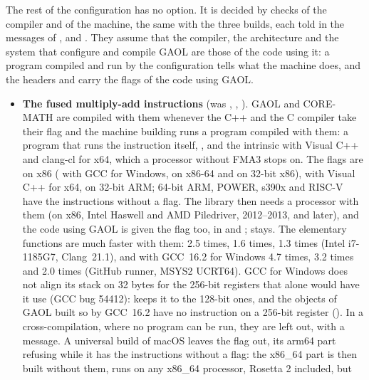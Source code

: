 \documentclass[12pt,a4paper,twoside,openright]{book}
\begin{document}
The rest of the configuration has no option. It is decided by checks of the
compiler and of the machine, the same with the three builds, each told in the
messages of ,  and . They assume
that the compiler, the architecture and the system that configure and compile
GAOL are those of the code using it: a program compiled and run by the
configuration tells what the machine does, and the headers and 
carry the flags of the code using GAOL.\newinvfive

\begin{itemize}
\item[$\bullet$] \textbf{The fused multiply-add instructions} (was
  , , ). GAOL and
  CORE-MATH are compiled with them whenever the C++ and the C compiler take
  their flag and the machine building runs a program compiled with them: a
  program that runs the instruction itself, , and
  the intrinsic  with Visual C++ and clang-cl for
  x64, which a processor without FMA3 stops on. The flags are
   on x86 ( with GCC
  for Windows, on x86-64 and on 32-bit x86),  with Visual
  C++ for x64,  on 32-bit ARM;
  64-bit ARM, POWER, s390x and RISC-V have the instructions without a flag.
  The library then needs a processor with them (on x86, Intel Haswell and AMD
  Piledriver, 2012--2013, and later), and the code using GAOL is given the
  flag too, in  and ; 
  stays. The elementary functions are much faster with them:  2.5
  times,  1.6 times,  1.3 times (Intel i7-1185G7,
  Clang~21.1), and with GCC~16.2 for Windows  4.7 times, 
  3.2 times and  2.0 times (GitHub runner, MSYS2 UCRT64). GCC for
  Windows does not align its stack on 32 bytes for the 256-bit registers that
   alone would have it use (GCC bug 54412):
   keeps it to the 128-bit ones, and the
  objects of GAOL built so by GCC~16.2 have no instruction on a 256-bit
  register (). In a cross-compilation, where
  no program can be run, they are left out, with a message. A universal build
  of macOS leaves the flag out, its arm64 part refusing  while
  it has the instructions without a flag: the x86\_64 part is then built
  without them, runs on any x86\_64 processor, Rosetta 2 included, but

\end{itemize}
\end{document}
